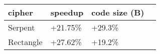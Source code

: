 \begin{tabular}{|l K{3cm}|K{3cm}|K{3cm}|}
  \hline
  \textbf{cipher} & \textbf{speedup} & \textbf{code size (B)}\\
  \hline
  Serpent & +21.75\% & +29.3\% \\
  \hline
  Rectangle & +27.62\% & +19.2\% \\
  \hline
\end{tabular}
